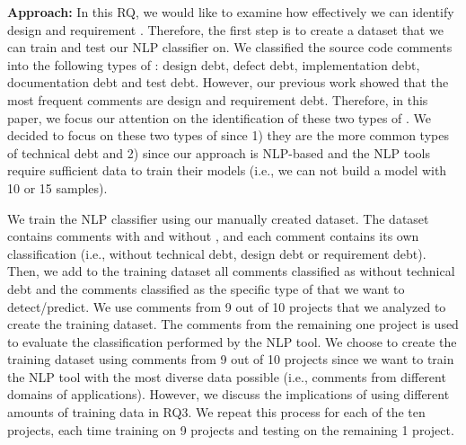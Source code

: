 
\vspace{1mm}
\noindent \textbf{Approach:} In this RQ, we would like to examine how effectively we can identify design and requirement \SATD. Therefore, the first step is to create a dataset that we can train and test our NLP classifier on. We classified the source code comments into the following types of \SATD: design debt, defect debt, implementation debt, documentation debt and test debt. However, our previous work showed that the most frequent \SATD comments are design and requirement debt. Therefore, in this paper, we focus our attention on the identification of these two types of \SATD. We decided to focus on these two types of \SATD since 1) they are the more common types of technical debt and 2) since our approach is NLP-based and the NLP tools require sufficient data to train their models (i.e., we can not build a model with 10 or 15 samples).




We train the NLP classifier using our manually created dataset. The dataset contains comments with and without \SATD, and each comment contains its own classification (i.e., without technical debt, design debt or requirement debt). Then, we add to the training dataset all comments classified as without technical debt and the comments classified as the specific type of \SATD that we want to detect/predict. We use comments from 9 out of 10 projects that we analyzed to create the training dataset. The comments from the remaining one project is used to evaluate the classification performed by the NLP tool. We choose to create the training dataset using comments from 9 out of 10 projects since we want to train the NLP tool with the most diverse data possible (i.e., comments from different domains of applications). However, we discuss the implications of using different amounts of training data in RQ3. We repeat this process for each of the ten projects, each time training on 9 projects and testing on the remaining 1 project.


